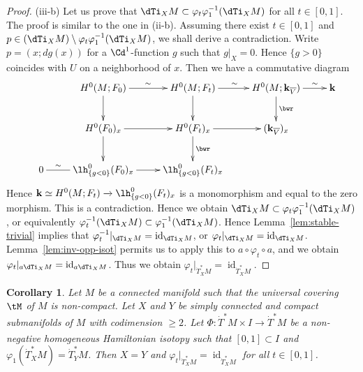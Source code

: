 \documentclass[12pt,leqno]{article}
\newtheorem{corollary}[theorem]{Corollary}
\theoremstyle{definition}
\def\phi{{\varphi}}
\newcommand{\cor}{{\bf k}}
\renewcommand{\to}[1][]{\xrightarrow[]{#1}}
\newcommand{\cl}{\colon}
\newcommand{\ol}{\overline}
\newcommand{\eqn}{\begin{eqnarray*}}
\newcommand{\eneqn}{\end{eqnarray*}}
\DeclareMathOperator{\id}{id}
\newcommand{\dT}{{\dot{T}}}
\newcommand{\dTM}{{\dT}^*M}
\numberwithin{equation}{section}
\begin{document}
\begin{proof}
\medskip\noindent
(iii-b)  Let us prove that $\dTi_XM\subset\phi_t\phi_1^{-1}(\dTi_XM)$ 
for all $t\in [0,1]$.
The proof is similar to the one in (ii-b).
Assuming there exist $t\in[0,1]$ and 
$p\in(\dTi_XM)\setminus \phi_t\phi_1^{-1}(\dTi_XM)$,
we shall derive a contradiction.
Write $p=(x;dg(x))$ for a $\Cd^1$-function $g$ such that
$g\vert_X=0$. Hence $\{g>0\}$ coincides with $U$ on a neighborhood of $x$.
Then we have a commutative diagram
\eqn
&&\xymatrix{
&H^0(M; F_0) \ar[r]^\sim \ar[d] & 
H^0(M; F_t) \ar[r]^\sim \ar[d] & 
H^0(M; \cor_{\ol{V}}) \ar[d]^{\bwr}\ar[r]^-{\sim}&\cor  \\
&H^0(F_0)_x\ar[d] \ar[r]&H^0(F_t)_x\ar[d]^-{\bwr} \ar[r] & (\cor_{\ol{V}})_x \\
0\ar@{-}[r]^-{\sim}&\lh^0_{\{g<0\}}(F_0)_x\ar[r]&
\lh^0_{\{g<0\}}(F_t)_x}
\eneqn
Hence $\cor\simeq H^0(M; F_t)\to\lh^0_{\{g<0\}}(F_t)_x$ is a monomorphism and
equal to the zero morphism.
This is a contradiction.
Hence we obtain $\dTi_XM\subset\phi_t\phi_1^{-1}(\dTi_XM)$,
or equivalently $\phi_t^{-1}(\dTi_XM) \subset\phi_1^{-1}(\dTi_XM)$.
Hence Lemma~\ref{lem:stable-trivial}
implies that $\phi_t^{-1}\vert_{\dTi_XM}=\id_{\dTi_XM}$, or
$\phi_t\vert_{\dTi_XM}=\id_{\dTi_XM}$.
Lemma~\ref{lem:inv-opp-isot} permits us
to apply this to $a\circ\phi_t\circ a$,
and we obtain $\phi_t\vert_{a\dTi_XM}=\id_{a\dTi_XM}$.
Thus we obtain $\phi_t\vert_{\dT^*_XM}=\id_{\dT^*_XM}$.
\end{proof}

\begin{corollary}\label{cor:positiso}
Let $M$ be a connected manifold such that
the universal covering $\tM$ of $M$ is
non-compact.
Let $X$ and $Y$ be simply connected and compact submanifolds of $M$
with codimension $\ge2$. 
Let $\Phi\cl\dTM\times I\to \dTM$ be
a non-negative homogeneous Hamiltonian isotopy 
such that $[0,1]\subset I$
and $\phi_1(\dT^*_XM)=\dT^*_YM$. Then $X=Y$ and 
$\phi_t|_{\dT^*_XM} = \id_{\dT^*_XM}$ for all $t\in[0,1]$.
\end{corollary}
\end{document}

